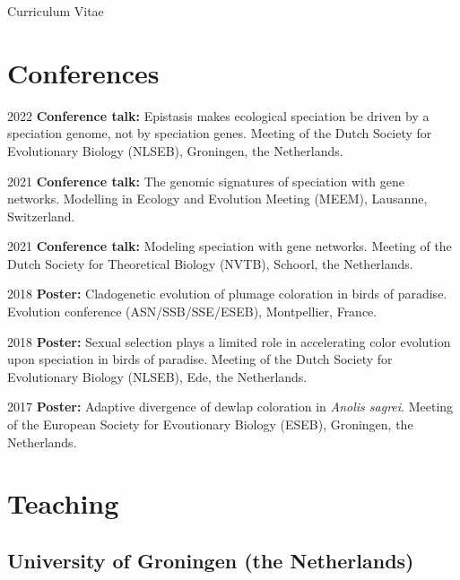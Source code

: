 \documentclass[11pt,a4paper]{article}
\begin{document}
\begin{cv}{Curriculum Vitae}
		\section{Conferences}
		
		\begin{cvlist}{}
			
			\item[2022]
			\textbf{Conference talk:} Epistasis makes ecological speciation be driven by a speciation genome, not by speciation genes. Meeting of the Dutch Society for Evolutionary Biology (NLSEB), Groningen, the Netherlands.
			
			\item[2021] 
			\textbf{Conference talk:} The genomic signatures of speciation with gene networks. Modelling in Ecology and Evolution Meeting (MEEM), Lausanne, Switzerland.
			
			\item[2021] 
			\textbf{Conference talk:} Modeling speciation with gene networks. Meeting of the Dutch Society for Theoretical Biology (NVTB), Schoorl, the Netherlands.
			
			\item[2018] 
			\textbf{Poster:} Cladogenetic evolution of plumage coloration in birds of paradise. Evolution conference (ASN/SSB/SSE/ESEB), Montpellier, France.
			
			\item[2018] 
			\textbf{Poster:} Sexual selection plays a limited role in accelerating color evolution upon speciation in birds of paradise. Meeting of the Dutch Society for Evolutionary Biology (NLSEB), Ede, the Netherlands.
			
			\item[2017] 
			\textbf{Poster:} Adaptive divergence of dewlap coloration in \textit{Anolis sagrei}. Meeting of the European Society for Evoutionary Biology (ESEB), Groningen, the Netherlands.
			
		\end{cvlist}
		
		\section{Teaching}
		
		\subsection{University of Groningen (the Netherlands)}
		
		\begin{cvlist}{}


\end{cvlist}
\end{cv}
\end{document}
